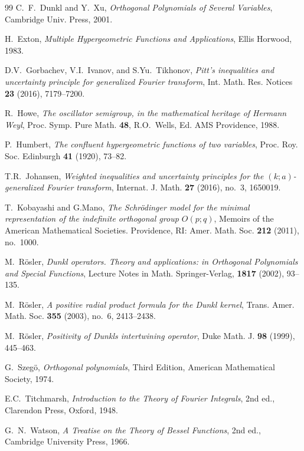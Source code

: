 \documentclass[12pt,twoside,reqno]{amsart}\usepackage[cp1251]{inputenc}
\theoremstyle{plain}
\theoremstyle{remark}
\begin{document}
\begin{thebibliography}{99}
C.~F.~Dunkl and Y.~Xu, \textit{Orthogonal Polynomials of Several Variables}, Cambridge
Univ. Press, 2001.

H.~Exton, \textit{Multiple Hypergeometric Functions and Applications}, Ellis Horwood, 1983.

D.V.~Gorbachev, V.I.~Ivanov, and S.Yu.~Tikhonov, \textit{Pitt's inequalities and
uncertainty principle for generalized Fourier transform}, Int. Math. Res. Notices
\textbf{23} (2016), 7179--7200.

R.~Howe, \textit{The oscillator semigroup, in the mathematical heritage of
Hermann Weyl}, Proc. Symp. Pure Math. \textbf{48}, R.O.~Wells, Ed. AMS
Providence, 1988.

P.~Humbert, \textit{The confluent hypergeometric functions of two variables},
Proc. Roy. Soc. Edinburgh \textbf{41} (1920), 73--82.

T.R.~Johansen, \textit{Weighted inequalities and uncertainty principles for the
$(k;a)$-generalized Fourier transform}, Internat. J. Math. \textbf{27} (2016),
no.~3, 1650019.

T.~Kobayashi and G.Mano, \textit{The Schr\"{o}dinger model for the minimal representation
of the indefinite orthogonal group $O(p;q)$}, Memoirs of the American
Mathematical Societies. Providence, RI:  Amer. Math. Soc. \textbf{212} (2011),
no.~1000.

M.~R\"{o}sler, \textit{Dunkl operators. Theory and applications: in Orthogonal
Polynomials and Special Functions}, Lecture Notes in Math. Springer-Verlag,
\textbf{1817} (2002), 93--135.

M.~R\"{o}sler, \textit{A positive radial product formula for the Dunkl kernel}, Trans. Amer. Math. Soc. \textbf{355} (2003), no.~6, 2413--2438.

M.~R\"{o}sler, \textit{Positivity of Dunkls intertwining operator}, Duke Math. J.
\textbf{98} (1999), 445--463.

G.~Szeg\"o, \textit{Orthogonal polynomials}, Third Edition, American Mathematical Society, 1974.

E.C.~Titchmarsh, \textit{Introduction to the Theory of Fourier Integrals}, 2nd
ed., Clarendon Press, Oxford, 1948.

G.~N.~Watson, \textit{A Treatise on the Theory of Bessel Functions}, 2nd ed.,
Cambridge University Press, 1966.

\end{thebibliography}
\end{document}
